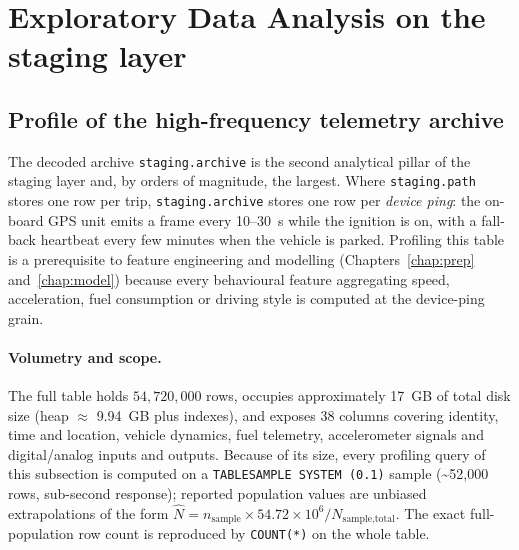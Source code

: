 \section{Exploratory Data Analysis on the staging layer}

\subsection{Profile of the high-frequency telemetry archive}
\label{sec:archive-eda}
The decoded archive \texttt{staging.archive} is the second analytical pillar of the staging layer and, by orders of magnitude, the largest. Where \texttt{staging.path} stores one row per trip, \texttt{staging.archive} stores one row per \emph{device ping}: the on-board GPS unit emits a frame every 10--30~s while the ignition is on, with a fall-back heartbeat every few minutes when the vehicle is parked. Profiling this table is a prerequisite to feature engineering and modelling (Chapters~\ref{chap:prep} and~\ref{chap:model}) because every behavioural feature aggregating speed, acceleration, fuel consumption or driving style is computed at the device-ping grain.

\paragraph{Volumetry and scope.}
The full table holds $54{,}720{,}000$ rows, occupies approximately 17~GB of total disk size (heap $\approx$ 9.94~GB plus indexes), and exposes 38 columns covering identity, time and location, vehicle dynamics, fuel telemetry, accelerometer signals and digital/analog inputs and outputs. Because of its size, every profiling query of this subsection is computed on a \texttt{TABLESAMPLE SYSTEM (0.1)} sample (\textasciitilde 52{,}000 rows, sub-second response); reported population values are unbiased extrapolations of the form $\hat{N} = n_{\text{sample}} \times 54.72\!\times\!10^6 / N_{\text{sample,total}}$. The exact full-population row count is reproduced by \texttt{COUNT(*)} on the whole table.

